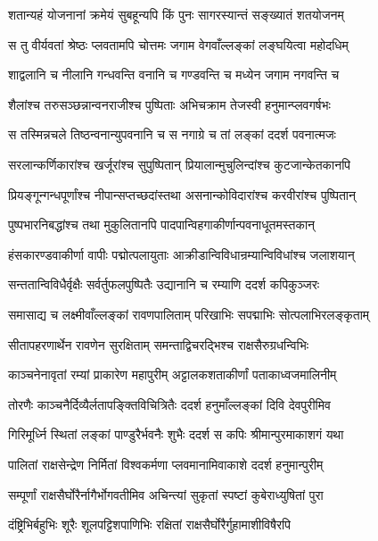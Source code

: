 \twolineshloka
{शतान्यहं योजनानां क्रमेयं सुबहून्यपि}
{किं पुनः सागरस्यान्तं सङ्ख्यातं शतयोजनम्} %

\twolineshloka
{स तु वीर्यवतां श्रेष्ठः प्लवतामपि चोत्तमः}
{जगाम वेगवाँल्लङ्कां लङ्घयित्वा महोदधिम्} %

\twolineshloka
{शाद्वलानि च नीलानि गन्धवन्ति वनानि च}
{गण्डवन्ति च मध्येन जगाम नगवन्ति च} %

\twolineshloka
{शैलांश्च तरुसञ्छन्नान्वनराजीश्च पुष्पिताः}
{अभिचक्राम तेजस्वी हनुमान्प्लवगर्षभः} %

\twolineshloka
{स तस्मिन्नचले तिष्ठन्वनान्युपवनानि च}
{स नगाग्रे च तां लङ्कां ददर्श पवनात्मजः} %

\twolineshloka
{सरलान्कर्णिकारांश्च खर्जूरांश्च सुपुष्पितान्}
{प्रियालान्मुचुलिन्दांश्च कुटजान्केतकानपि} %

\twolineshloka
{प्रियङ्गून्गन्धपूर्णांश्च नीपान्सप्तच्छदांस्तथा}
{असनान्कोविदारांश्च करवीरांश्च पुष्पितान्} %

\twolineshloka
{पुष्पभारनिबद्धांश्च तथा मुकुलितानपि}
{पादपान्विहगाकीर्णान्पवनाधूतमस्तकान्} %

\twolineshloka
{हंसकारण्डवाकीर्णा वापीः पद्मोत्पलायुताः}
{आक्रीडान्विविधान्रम्यान्विविधांश्च जलाशयान्} %

\twolineshloka
{सन्ततान्विविधैर्वृक्षैः सर्वर्तुफलपुष्पितैः}
{उद्यानानि च रम्याणि ददर्श कपिकुञ्जरः} %

\twolineshloka
{समासाद्य च लक्ष्मीवाँल्लङ्कां रावणपालिताम्}
{परिखाभिः सपद्माभिः सोत्पलाभिरलङ्कृताम्} %

\twolineshloka
{सीतापहरणार्थेन रावणेन सुरक्षिताम्}
{समन्ताद्विचरद्भिश्च राक्षसैरुग्रधन्विभिः} %

\twolineshloka
{काञ्चनेनावृतां रम्यां प्राकारेण महापुरीम्}
{अट्टालकशताकीर्णां पताकाध्वजमालिनीम्} %

\twolineshloka
{तोरणैः काञ्चनैर्दिव्यैर्लतापङ्क्तिविचित्रितैः}
{ददर्श हनुमाँल्लङ्कां दिवि देवपुरीमिव} %

\twolineshloka
{गिरिमूर्ध्नि स्थितां लङ्कां पाण्डुरैर्भवनैः शुभैः}
{ददर्श स कपिः श्रीमान्पुरमाकाशगं यथा} %

\twolineshloka
{पालितां राक्षसेन्द्रेण निर्मितां विश्वकर्मणा}
{प्लवमानामिवाकाशे ददर्श हनुमान्पुरीम्} %

\twolineshloka
{सम्पूर्णां राक्षसैर्घोरैर्नागैर्भोगवतीमिव}
{अचिन्त्यां सुकृतां स्पष्टां कुबेराध्युषितां पुरा} %

\twolineshloka
{दंष्ट्रिभिर्बहुभिः शूरैः शूलपट्टिशपाणिभिः}
{रक्षितां राक्षसैर्घोरैर्गुहामाशीविषैरपि} %

